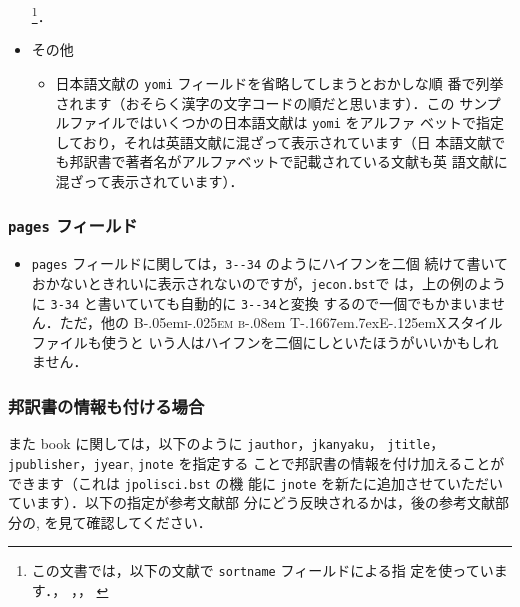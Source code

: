 \documentclass[article]{jlreq}
\newcommand{\BibTeX}{\textrm{B\kern-.05em\textsc{i\kern-.025em b}\kern-.08em%
T\kern-.1667em\lower.7ex\hbox{E}\kern-.125emX}}
\begin{document}
\begin{itemize}
       \footnote{この文書では，以下の文献で \texttt{sortname} フィールドによる指
       定を使っています．\citet{takeda-gtap-2016ja}，
       \citet{takeda07jp:CGE_for_rieti}，\citet{isikawa02jp:_env_trade}，
       \citet{kiyono93:_regu_comp_1}}．
 \item その他
       \begin{itemize}
        \item 日本語文献の \texttt{yomi} フィールドを省略してしまうとおかしな順
              番で列挙されます（おそらく漢字の文字コードの順だと思います）．この
              サンプルファイルではいくつかの日本語文献は \texttt{yomi} をアルファ
              ベットで指定しており，それは英語文献に混ざって表示されています（日
              本語文献でも邦訳書で著者名がアルファベットで記載されている文献も英
              語文献に混ざって表示されています）．
       \end{itemize}
\end{itemize}


\subsubsection{\texttt{pages} フィールド}

\begin{itemize}
 \item \texttt{pages} フィールドに関しては，\verb|3--34| のようにハイフンを二個
       続けて書いておかないときれいに表示されないのですが，\texttt{jecon.bst}で
       は，上の例のように \verb|3-34| と書いていても自動的に \verb|3--34|と変換
       するので一個でもかまいません．ただ，他の \BibTeX スタイルファイルも使うと
       いう人はハイフンを二個にしといたほうがいいかもしれません．
\end{itemize}

\subsubsection{邦訳書の情報も付ける場合}

また book に関しては，以下のように \texttt{jauthor}，\texttt{jkanyaku}，
\texttt{jtitle}，\texttt{jpublisher}，\texttt{jyear}, \texttt{jnote} を指定する
ことで邦訳書の情報を付け加えることができます（これは \texttt{jpolisci.bst} の機
能に \texttt{jnote} を新たに追加させていただいています）．以下の指定が参考文献部
分にどう反映されるかは，後の参考文献部分の\cite{fujita99jp:_spatial_econom},
\cite{romer19jp:_advan_macroecon}を見て確認してください．\\
\end{document}
